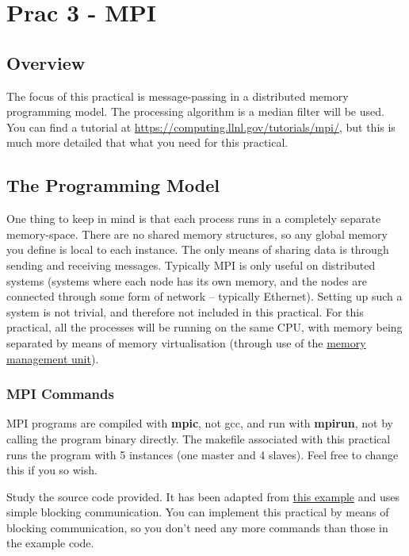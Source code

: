 \section{Prac 3 - MPI}
\label{sec:Prac3}
\subsection{Overview}
The focus of this practical is message-passing in a distributed memory programming model. The processing algorithm is a median filter will be used. You can find a tutorial at \href{https://computing.llnl.gov/tutorials/mpi/}{https://computing.llnl.gov/tutorials/mpi/}, but this is much more detailed that what you need for this practical.

\subsection{The Programming Model}
One thing to keep in mind is that each process runs in a completely separate memory-space.
There are no shared memory structures, so any global memory you define is local to each
instance. The only means of sharing data is through sending and receiving messages.
Typically MPI is only useful on distributed systems (systems where each node has its own
memory, and the nodes are connected through some form of network – typically Ethernet).
Setting up such a system is not trivial, and therefore not included in this practical. For this
practical, all the processes will be running on the same CPU, with memory being separated
by means of memory virtualisation (through use of the \href{https://en.wikipedia.org/wiki/Memory_management_unit}{memory management unit}).

\subsubsection{MPI Commands}
MPI programs are compiled with \textbf{mpic}, not gcc, and run with \textbf{mpirun}, not by calling the program binary directly. The makefile associated with this practical runs the program with 5 instances (one master and 4 slaves). Feel free to change this if you so wish. 

Study the source code provided. It has been adapted from \href{https://en.wikipedia.org/wiki/Message_Passing_Interface#Example_program}{this example} and uses simple blocking communication. You can implement this practical by means of blocking communication, so you don’t need any more commands than those in the example code. 

